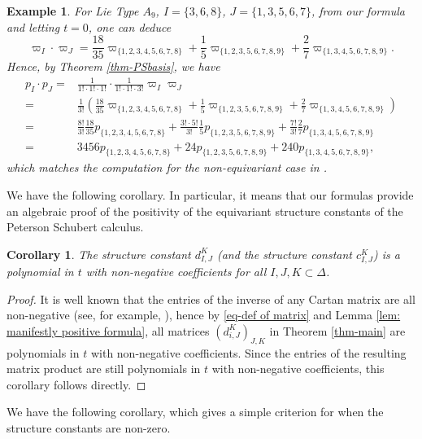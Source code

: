 \documentclass[11pt, letterpaper]{amsart}
\numberwithin{equation}{section}
\newtheorem{corollary}[theorem]{Corollary}
\newtheorem{eg}[theorem]{Example}
\begin{document}
\begin{eg}
    For Lie Type $A_9$, $I=\{3,6,8\}$, $J=\{1,3,5,6,7\}$, from our formula and letting $t=0$, one can deduce 
    \[
    \varpi_I \cdot  \varpi_J=\frac{18}{35}\varpi_{\{1,2,3,4,5,6,7,8\}}+\frac{1}{5}\varpi_{\{1,2,3,5,6,7,8,9\}}+\frac{2}{7}\varpi_{\{1,3,4,5,6,7,8,9\}}.
    \]
    Hence, by Theorem \ref{thm-PSbasis}, we have
    \begin{align*}
    p_I\cdot p_J=& \frac{1}{1!\cdot 1!\cdot1!}\cdot\frac{1}{1!\cdot1!\cdot3!}\varpi_I\varpi_J\\ 
    =&\frac{1}{3!}\left(\frac{18}{35}\varpi_{\{1,2,3,4,5,6,7,8\}}+\frac{1}{5}\varpi_{\{1,2,3,5,6,7,8,9\}}+\frac{2}{7}\varpi_{\{1,3,4,5,6,7,8,9\}}\right)\\
    =&\frac{8!}{3!}\frac{18}{35}p_{\{1,2,3,4,5,6,7,8\}}+\frac{3!\cdot5!}{3!}\frac{1}{5}p_{\{1,2,3,5,6,7,8,9\}}+\frac{7!}{3!}\frac{2}{7}p_{\{1,3,4,5,6,7,8,9\}}\\
    =&3456p_{\{1,2,3,4,5,6,7,8\}}+24p_{\{1,2,3,5,6,7,8,9\}}+240p_{\{1,3,4,5,6,7,8,9\}},
    \end{align*}
    which matches the computation for the non-equivariant case in \cite[Example 5.2]{abe2024geometry}.
\end{eg}

We have the following corollary. In particular, it means that our formulas provide an algebraic proof of the positivity of the equivariant structure constants of the Peterson Schubert calculus.

\begin{corollary}\label{cor-positivity}
The structure constant  $d_{I,J}^K$ (and the structure constant $c_{I,J}^K$) is a polynomial in $t$ with non-negative coefficients for all $I, J, K\subset\Delta$.
\end{corollary}

\begin{proof}
    It is well known that the entries of the inverse of any Cartan matrix are all non-negative (see, for example, \cite[Exercise 13.8]{humphreys1972}), hence by \eqref{eq-def of matrix} and Lemma \ref{lem: manifestly positive formula}, all matrices $(d^{K}_{i, J})_{J, K}$ in Theorem \ref{thm-main} are polynomials in $t$ with non-negative coefficients.
Since the entries of the resulting matrix product are still polynomials in $t$ with non-negative coefficients, this corollary follows directly. 
\end{proof}

We have the following corollary, which gives a simple criterion for when the structure constants are non-zero.
\end{document}
